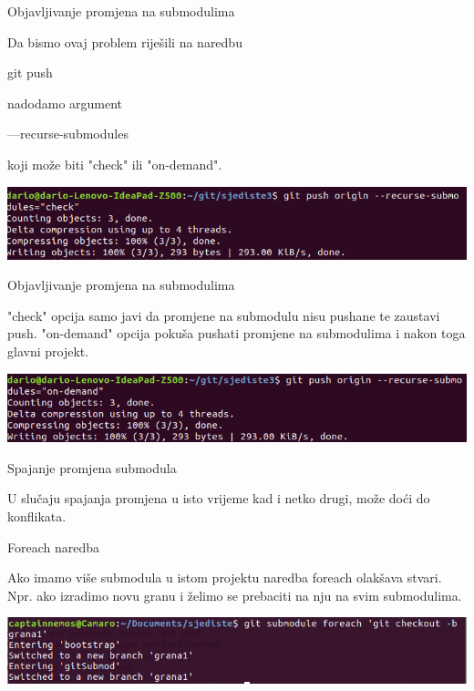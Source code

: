 \documentclass[10pt]{beamer}
\begin{document}
\begin{frame}[fragile]{Objavljivanje promjena na submodulima}
    
    Da bismo ovaj problem riješili na naredbu
    \begin{semiverbatim}git push\end{semiverbatim}
    nadodamo argument \begin{semiverbatim}---recurse-submodules\end{semiverbatim}
    koji može biti "check" ili "on-demand".
    
    \includegraphics[scale=0.4]{sub_check}
\end{frame}

\begin{frame}[fragile]{Objavljivanje promjena na submodulima}
    
    "check" opcija samo javi da promjene na submodulu nisu pushane te zaustavi push.
    "on-demand" opcija pokuša pushati promjene na submodulima i nakon toga glavni projekt.

    \includegraphics[scale=0.4]{sub_ondemand}
    
\end{frame}

\begin{frame}[fragile]{Spajanje promjena submodula}
    
    U slučaju spajanja promjena u isto vrijeme kad i netko drugi, može doći do konflikata.
    
    
\end{frame}

\begin{frame}[fragile]{Foreach naredba}
    
    Ako imamo više submodula u istom projektu naredba foreach olakšava stvari.
	Npr. ako izradimo novu granu i želimo se prebaciti na nju na svim submodulima.
	
    \includegraphics[scale=0.4]{sub_foreach}
\end{frame}
\end{document}
